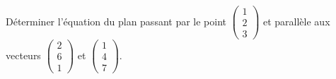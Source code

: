 
\begin{exercice}\label{exoOutilsMath-0072}

    Déterminer l'équation du plan passant par le point $\begin{pmatrix}
        1    \\ 
        2    \\ 
        3    
    \end{pmatrix}$ et parallèle aux vecteurs $\begin{pmatrix}
        2    \\ 
        6    \\ 
        1    
    \end{pmatrix}$ et $\begin{pmatrix}
        1    \\ 
        4    \\ 
        7    
    \end{pmatrix}$.

\end{exercice}
